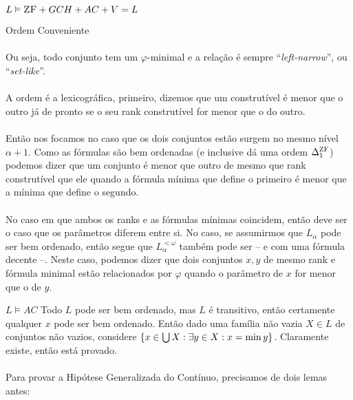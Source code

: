 \begin{theorem}{$L\vDash\text{\sc ZF}+GCH+AC+V=L$}
\begin{lemma}{Ordem Conveniente}
                \paragraph{}
                    Ou seja, todo conjunto tem um $\varphi$-minimal e a relação é sempre ``\textit{left-narrow}'', ou ``\textit{set-like}''.
                \paragraph{}
                    A ordem é a lexicográfica, primeiro, dizemos que um construtível é menor que o outro já de pronto se o seu 
                    rank construtível for menor que o do outro. 
                \paragraph{}
                    Então nos focamos no caso que os dois conjuntos estão surgem 
                    no mesmo nível $\alpha+1$. Como as fórmulas são bem ordenadas (e inclusive \cite{Drake} dá uma ordem $\Delta^{\text{\sc ZF}}_{1}$)
                    podemos dizer que um conjunto é menor que outro de mesmo que rank construtível que ele quando a fórmula mínima que 
                    define o primeiro é menor que a mínima que define o segundo.
                \paragraph{}
                    No caso em que ambos os ranks e as fórmulas mínimas coincidem, então deve ser o caso que os parâmetros diferem entre 
                    si. No caso, se assumirmos que $L_\alpha$ pode ser bem ordenado, então segue que $L_\alpha^{<\omega}$ também pode 
                    ser -- e com uma fórmula decente --. Neste caso, podemos dizer que dois conjuntos $x,y$ de mesmo rank e fórmula 
                    minimal estão relacionados por $\varphi$ quando o parâmetro de $x$ for menor que o de $y$.
            \end{lemma}
            \begin{theorem}{$L\vDash AC$}
                Todo $L$ pode ser bem ordenado, mas $L$ é transitivo, então certamente qualquer $x$ pode ser bem ordenado. Então 
                dado uma família não vazia $X\in L$ de conjuntos não vazios, considere 
                $\SET{x\in \bigcup X: \exists y\in X: x = \min{y}}$. Claramente existe, então está provado.\eop
            \end{theorem}
            \paragraph{}
                Para provar a Hipótese Generalizada do Contínuo, precisamos de dois lemas antes:
            


\end{theorem}
